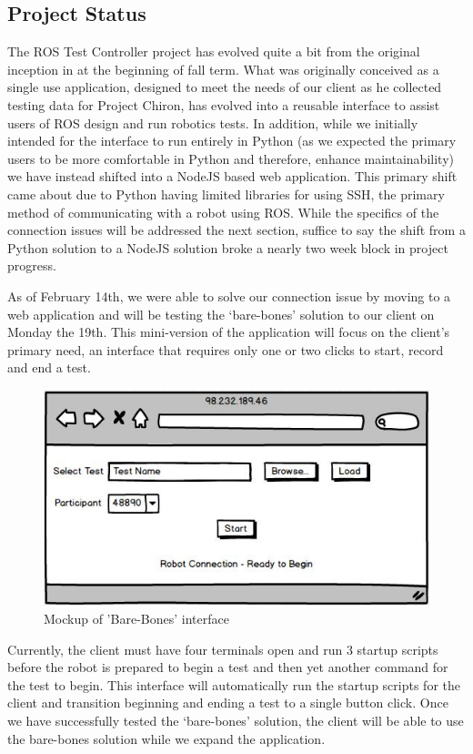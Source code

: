 \documentclass[onecolumn, draftclsnofoot,10pt, compsoc]{IEEEtran}
\begin{document}
\subsection{Project Status}
The ROS Test Controller project has evolved quite a bit from the original inception in at the beginning of fall term. What was originally conceived as a single use application, designed to meet the needs of our client as he collected testing data for Project Chiron, has evolved into a reusable interface to assist users of ROS design and run robotics tests. In addition, while we initially intended for the interface to run entirely in Python (as we expected the primary users to be more comfortable in Python and therefore, enhance maintainability) we have instead shifted into a NodeJS based web application. This primary shift came about due to Python having limited libraries for using SSH, the primary method of communicating with a robot using ROS. While the specifics of the connection issues will be addressed the next section, suffice to say the shift from a Python solution to a NodeJS solution broke a nearly two week block in project progress. 

As of February 14th, we were able to solve our connection issue by moving to a web application and will be testing the ‘bare-bones’ solution to our client on Monday the 19th. This mini-version of the application will focus on the client’s primary need, an interface that requires only one or two clicks to start, record and end a test.

\begin{figure}[H]
	\centering
	\includegraphics[scale=0.6]{BarebonesMockup.jpg}
	\centering
	\caption{Mockup of 'Bare-Bones' interface}
\end{figure}

Currently, the client must have four terminals open and run 3 startup scripts before the robot is prepared to begin a test and then yet another command for the test to begin. This interface will automatically run the startup scripts for the client and transition beginning and ending a test to a single button click. Once we have successfully tested the ‘bare-bones’ solution, the client will be able to use the bare-bones solution while we expand the application. 
\end{document}
